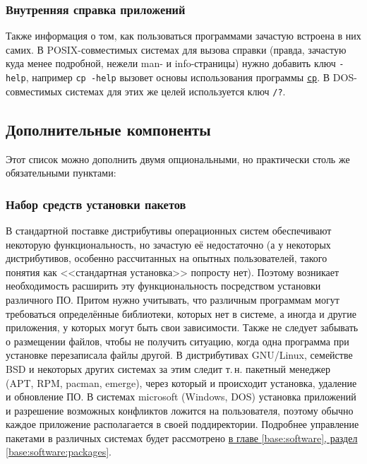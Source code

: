 \subsubsection{Внутренняя справка приложений}
Также информация о том, как пользоваться программами зачастую встроена в них самих. В POSIX-совместимых системах для вызова справки (правда, зачастую куда менее подробной, нежели man- и info-стра\-ни\-цы) нужно добавить ключ \texttt{-\text{-}help}, например \texttt{cp -\text{-}help} вызовет основы использования программы \hyperref[base:os:structure:userutils:files]{\texttt{cp}}. В DOS-совместимых системах для этих же целей используется ключ \texttt{/?}.

\subsection{Дополнительные компоненты}\label{base:os:structure:additional}
Этот список можно дополнить двумя опциональными, но практически столь же обязательными пунктами:

\subsubsection{Набор средств установки пакетов}\label{base:os:structure:additional:packagemanager}
В стандартной поставке дистрибутивы операционных систем обеспечивают некоторую функциональность, но зачастую её недостаточно (а у некоторых дистрибутивов, особенно рассчитанных на опытных пользователей, такого понятия как <<стандартная установка>> попросту нет). Поэтому возникает необходимость расширить эту функциональность посредством установки различного ПО.
Притом нужно учитывать, что различным программам могут требоваться определённые библиотеки, которых нет в системе, а иногда и другие приложения, у которых могут быть свои зависимости. Также не следует забывать о размещении файлов, чтобы не получить ситуацию, когда одна программа при установке перезаписала файлы другой.
В дистрибутивах GNU/Linux, семействе BSD и некоторых других системах за этим следит т.\,н. пакетный менеджер (APT, RPM, pacman, emerge), через который и происходит установка, удаление и обновление ПО. В системах microsoft (Windows\texttrademark, DOS) установка приложений и разрешение возможных конфликтов ложится на пользователя, поэтому обычно каждое приложение располагается в своей поддиректории. Подробнее управление пакетами в различных системах будет рассмотрено \hyperref[base:software:packages]{в главе \ref*{base:software}, раздел \ref*{base:software:packages}}.

